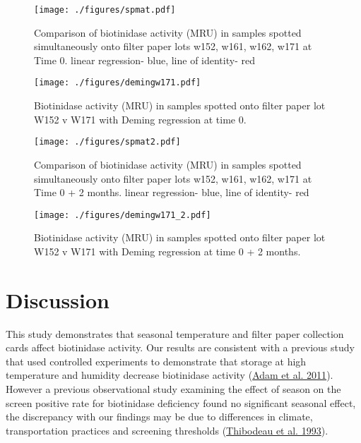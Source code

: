 \documentclass[review]{elsarticle}
\begin{document}
\begin{figure}[htbp]
\centering
\texttt{[image: ./figures/spmat.pdf]}
\caption{\label{fig:orgb426875}Comparison of biotinidase activity (MRU) in samples spotted simultaneously onto filter paper lots w152, w161, w162, w171 at Time 0. linear regression- blue, line of identity- red}
\end{figure}

\begin{figure}[htbp]
\centering
\texttt{[image: ./figures/demingw171.pdf]}
\caption{\label{fig:org3da4de2}Biotinidase activity (MRU) in samples spotted onto filter paper lot W152 v W171 with Deming regression at time 0.}
\end{figure}
\clearpage

\begin{figure}[htbp]
\centering
\texttt{[image: ./figures/spmat2.pdf]}
\caption{\label{fig:org529f81c}Comparison of biotinidase activity (MRU) in samples spotted simultaneously onto filter paper lots w152, w161, w162, w171 at Time 0 + 2 months. linear regression- blue, line of identity- red}
\end{figure}

\begin{figure}[htbp]
\centering
\texttt{[image: ./figures/demingw171\_2.pdf]}
\caption{\label{fig:org58540e9}Biotinidase activity (MRU) in samples spotted onto filter paper lot W152 v W171 with Deming regression at time 0 + 2 months.}
\end{figure}

\clearpage

\section*{Discussion}
\label{sec:orge503624}
This study demonstrates that seasonal temperature and filter paper
collection cards affect biotinidase activity. Our results are
consistent with a previous study that used controlled experiments to
demonstrate that storage at high temperature and humidity decrease
biotinidase activity (\hyperlink{citeproc_bib_item_1}{Adam et al. 2011}). However a previous
observational study examining the effect of season on the screen
positive rate for biotinidase deficiency found no significant seasonal
effect, the discrepancy with our findings may be due to differences in
climate, transportation practices and screening thresholds (\hyperlink{citeproc_bib_item_12}{Thibodeau et al. 1993}).
\end{document}
